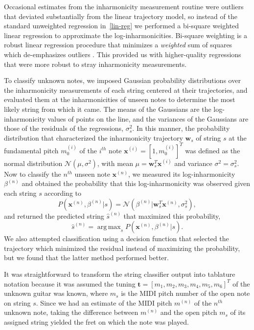 \documentclass[convention,peer-reviewed]{aesconf}
\DeclareMathOperator*{\argmax}{arg\,max}
\begin{document}
Occasional estimates from the inharmonicity measurement routine were outliers that deviated substantially from the linear trajectory model, so instead of the standard unweighted regression in~\eqref{lin-reg} we performed a bi-square weighted linear regression to approximate the log-inharmonicities. Bi-square weighting is a robust linear regression procedure that minimizes a \textit{weighted} sum of squares which de-emphasizes outliers \citep{matlab-robustfit}. This provided us with higher-quality regressions that were more robust to stray inharmonicity measurements.

To classify unknown notes, we imposed Gaussian probability distributions over the inharmonicity measurements of each string centered at their trajectories, and evaluated them at the inharmonicities of unseen notes to determine the most likely string from which it came. The means of the Gaussians are the log-inharmonicity values of points on the line, and the variances of the Gaussians are those of the residuals of the regressions, $\sigma_s^2$. In this manner, the probability distribution that characterized the inharmonicity trajectory $\mathbf{w}_s$ of string $s$ at the fundamental pitch $m_0^{(i)}$ of the $i^{th}$ note $\mathbf{x}^{(i)} = [1,m_0^{(i)}]^T$ was defined as the normal distribution $\mathcal{N}(\mu, \sigma^2)$, with mean $\mu = \mathbf{w}_s^T\mathbf{x}^{(i)}$ and variance $\sigma^2 = \sigma_s^2$. Now to classify the $n^{th}$ unseen note $\mathbf{x}^{(n)}$, we measured its log-inharmonicity $\beta^{(n)}$ and obtained the probability that this log-inharmonicity was observed given each string $s$ according to
\begin{equation}
P(\mathbf{x}^{(n)},\beta^{(n)} | s) = \mathcal{N}(\beta^{(n)} | \mathbf{w}_s^T\mathbf{x}^{(n)},\sigma_s^2),
\end{equation}
and returned the predicted string $\hat{s}^{(n)}$ that maximized this probability,
\begin{equation}
\hat{s}^{(n)} = \argmax_{s}P(\mathbf{x}^{(n)},\beta^{(n)} | s).
\label{eq:string-argmax}
\end{equation}
We also attempted classification using a decision function that selected the trajectory which minimized the residual instead of maximizing the probability, but we found that the latter method performed better.

It was straightforward to transform the string classifier output into tablature notation because it was assumed the tuning $\mathbf{t} = [m_1, m_2, m_3, m_4, m_5, m_6]^T$ of the unknown guitar was known, where $m_s$ is the MIDI pitch number of the open note on string $s$. Since we had an estimate of the MIDI pitch $m^{(n)}$ of the $n^{th}$ unknown note, taking the difference between $m^{(n)}$ and the open pitch $m_s$ of its assigned string yielded the fret on which the note was played.
\end{document}
